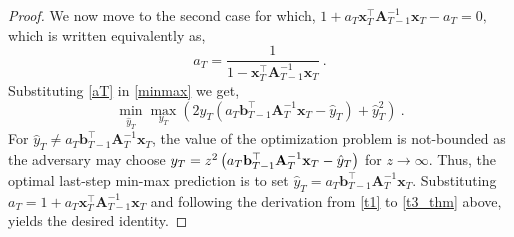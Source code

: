 \begin{proof}
We now move to the second case for which,
\(
1+a_{T}\mathbf{x}_{T}^{\top}\mathbf{A}_{T-1}^{-1}\mathbf{x}_{T}-a_{T}=0,
\)
which is written equivalently as,
\begin{equation}
a_{T}=\frac{1}{1-\mathbf{x}_{T}^{\top}\mathbf{A}_{T-1}^{-1}\mathbf{x}_{T}}
~. \label{aT}
\end{equation}
Substituting \eqref{aT} in \eqref{minmax} we get,
\[
\min_{\hat{y}_{T}}\max_{y_{T}}\left(2y_{T}\left(a_{T}\mathbf{b}_{T-1}^{\top}\mathbf{A}_{T}^{-1}\mathbf{x}_{T}-\hat{y}_{T}\right)+\hat{y}_{T}^{2}\right) ~.
\]
For $\hat{y}_{T}\neq
a_{T}\mathbf{b}_{T-1}^{\top}\mathbf{A}_{T}^{-1}\mathbf{x}_{T}$, the
value of the optimization problem is not-bounded as the adversary
may choose $y_{T} =z^2
\left(a_{T}\mathbf{b}_{T-1}^{\top}\mathbf{A}_{T}^{-1}\mathbf{x}_{T}-\hat{y}_{T}\right)
$ for $z\rightarrow\infty$. Thus, the optimal last-step min-max prediction
is to set
$\hat{y}_{T}=a_{T}\mathbf{b}_{T-1}^{\top}\mathbf{A}_{T}^{-1}\mathbf{x}_{T}$.
Substituting $a_T =
1+a_{T}\mathbf{x}_{T}^{\top}\mathbf{A}_{T-1}^{-1}\mathbf{x}_{T}$ and
following the derivation from \eqref{t1} to \eqref{t3_thm} above, yields the
desired identity.
%
 \QED\end{proof}
